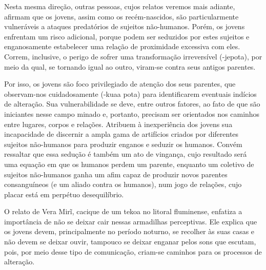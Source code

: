 Nesta mesma direção, outras pessoas, cujos relatos veremos mais adiante,
afirmam que os jovens, assim como os recém-nascidos, são
particularmente vulneráveis a ataques predatórios de sujeitos
não-humanos. Porém, os jovens enfrentam um risco adicional, porque
podem ser seduzidos por estes sujeitos e enganosamente estabelecer uma
relação de proximidade excessiva com eles. Correm, inclusive, o perigo
de sofrer uma transformação irreversível (-jepota), por meio da qual,
se tornando igual ao outro, viram-se contra seus antigos parentes.

Por isso, os jovens são foco privilegiado de atenção dos seus parentes,
que observam-nos cuidadosamente (-kuaa pota) para identificarem
eventuais indícios de alteração. Sua vulnerabilidade se deve, entre
outros fatores, ao fato de que são iniciantes nesse campo minado e,
portanto, precisam ser orientados nos caminhos entre lugares, corpos e
relações. Atribuem à inexperiência dos jovens sua incapacidade de
discernir a ampla gama de artifícios criados por diferentes sujeitos
não-humanos para produzir enganos e seduzir os humanos. Convém
ressaltar que essa sedução é também um ato de vingança, cujo resultado
será uma equação em que os humanos perdem um parente, enquanto um
coletivo de sujeitos não-humanos ganha um afim capaz de produzir novos
parentes consanguíneos (e um aliado contra os humanos), num jogo de
relações, cujo placar está em perpétuo desequilíbrio.

O relato de Vera Mirĩ, cacique de um tekoa no litoral fluminense,
enfatiza a importância de não se deixar cair nessas armadilhas
perceptivas. Ele explica que os jovens devem, principalmente no período
noturno, se recolher às suas casas e não devem se deixar ouvir,
tampouco se deixar enganar pelos sons que escutam, pois, por meio desse
tipo de comunicação, criam-se caminhos para os processos de alteração.

\bigskip

